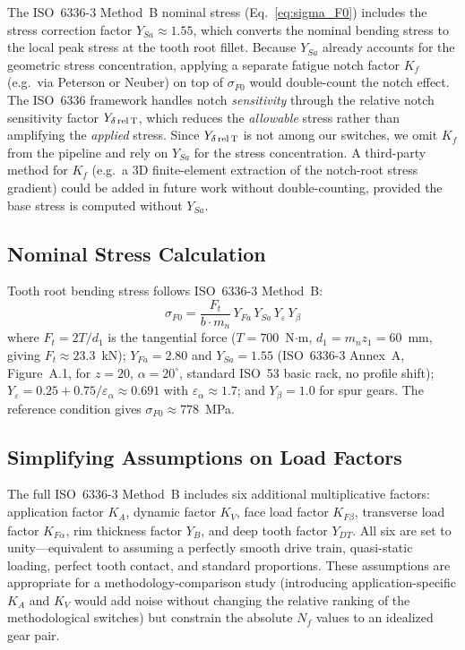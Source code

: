 \documentclass[12pt,a4paper]{article}
\begin{document}
The ISO~6336-3 Method~B nominal stress (Eq.~\ref{eq:sigma_F0}) includes
the stress correction factor $Y_{Sa} \approx 1.55$, which converts the
nominal bending stress to the local peak stress at the tooth root
fillet. Because $Y_{Sa}$ already accounts for the geometric stress
concentration, applying a separate fatigue notch factor $K_f$ (e.g.\
via Peterson or Neuber) on top of $\sigma_{F0}$ would double-count the
notch effect. The ISO~6336 framework handles notch \emph{sensitivity}
through the relative notch sensitivity factor $Y_{\delta\,\rm rel\,T}$,
which reduces the \emph{allowable} stress rather than amplifying the
\emph{applied} stress. Since $Y_{\delta\,\rm rel\,T}$ is not among our
switches, we omit $K_f$ from the pipeline and rely on $Y_{Sa}$ for the
stress concentration. A third-party method for $K_f$ (e.g.\ a 3D
finite-element extraction of the notch-root stress gradient) could be
added in future work without double-counting, provided the base stress
is computed without $Y_{Sa}$.

\subsection{Nominal Stress Calculation}

Tooth root bending stress follows ISO~6336-3 Method~B:
\begin{equation}
\label{eq:sigma_F0}
\sigma_{F0} = \frac{F_t}{b \cdot m_n} \,
Y_{Fa} \, Y_{Sa} \, Y_\varepsilon \, Y_\beta
\end{equation}
where $F_t = 2T/d_1$ is the tangential force ($T=700$~N$\cdot$m,
$d_1 = m_n z_1 = 60$~mm, giving $F_t \approx 23.3$~kN);
$Y_{Fa}=2.80$ and $Y_{Sa}=1.55$ (ISO~6336-3 Annex~A, Figure~A.1,
for $z=20$, $\alpha=20^\circ$, standard ISO~53 basic rack, no profile
shift); $Y_\varepsilon = 0.25 + 0.75/\varepsilon_\alpha \approx 0.691$
with $\varepsilon_\alpha \approx 1.7$; and $Y_\beta = 1.0$ for spur
gears. The reference condition gives $\sigma_{F0} \approx 778$~MPa.

\subsection{Simplifying Assumptions on Load Factors}

The full ISO~6336-3 Method~B includes six additional multiplicative
factors: application factor $K_A$, dynamic factor $K_V$, face load
factor $K_{F\beta}$, transverse load factor $K_{F\alpha}$, rim
thickness factor $Y_B$, and deep tooth factor $Y_{DT}$. All six are set
to unity---equivalent to assuming a perfectly smooth drive train,
quasi-static loading, perfect tooth contact, and standard proportions.
These assumptions are appropriate for a methodology-comparison study
(introducing application-specific $K_A$ and $K_V$ would add noise
without changing the relative ranking of the methodological switches)
but constrain the absolute $N_f$ values to an idealized gear pair.
\end{document}
